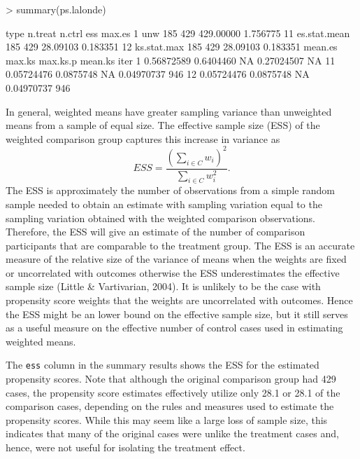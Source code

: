 \documentclass{article}
\begin{document}
\begin{Schunk}
\begin{Sinput}
> summary(ps.lalonde)
\end{Sinput}
\begin{Soutput}
           type n.treat n.ctrl       ess   max.es
1           unw     185    429 429.00000 1.756775
11 es.stat.mean     185    429  28.09103 0.183351
12  ks.stat.max     185    429  28.09103 0.183351
      mean.es    max.ks max.ks.p    mean.ks iter
1  0.56872589 0.6404460       NA 0.27024507   NA
11 0.05724476 0.0875748       NA 0.04970737  946
12 0.05724476 0.0875748       NA 0.04970737  946
\end{Soutput}
\end{Schunk}

In general, weighted means have greater sampling variance than unweighted means
from a sample of equal size. The effective sample size (ESS) of the weighted
comparison group captures this increase in variance as
\begin{equation}
ESS = \frac{\left(\sum_{i\in C} w_i\right)^2}{\sum_{i\in C} w_i^2}.
\label{eq:ESS}
\end{equation}
The ESS is approximately the number of observations from a simple random sample
needed to obtain an estimate with sampling variation equal to the sampling
variation obtained with the weighted comparison observations. Therefore, the
ESS will give an estimate of the number of comparison participants that are
comparable to the treatment group.  The ESS is an accurate measure of the relative size of the variance of means 
when the weights are fixed or uncorrelated with outcomes otherwise the ESS underestimates the effective sample size
(Little \& Vartivarian, 2004). It is unlikely to be the case with propensity score weights that 
the weights are uncorrelated with outcomes.  Hence the ESS might be an lower bound on the effective sample size, 
but it still serves as a useful measure on the effective number of control cases used in estimating weighted means.

The \texttt{ess} column in the summary
results shows the ESS for the estimated propensity scores. Note that although
the original comparison group had 429 cases,
the propensity score estimates effectively utilize only
28.1 or
28.1 of the comparison cases,
depending on the rules and measures used to estimate the propensity scores.
While this may seem like a large loss of sample size, this indicates that many
of the original cases were unlike the treatment cases and, hence, were not
useful for isolating the treatment effect.
\end{document}
